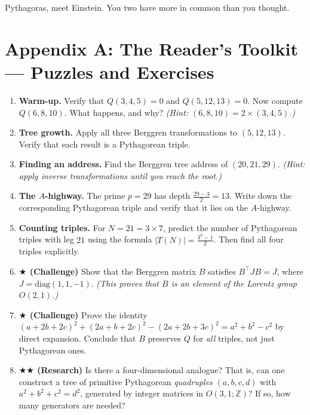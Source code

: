 \documentclass[11pt,twoside,openright]{book}
\theoremstyle{definition}
\theoremstyle{remark}
\begin{document}
Pythagoras, meet Einstein. You two have more in common than you thought.


\section{Appendix A: The Reader's Toolkit --- Puzzles and Exercises}

\begin{enumerate}
  \item \textbf{Warm-up.} Verify that $Q(3, 4, 5) = 0$ and $Q(5, 12, 13) = 0$. Now compute $Q(6, 8, 10)$. What happens, and why? \textit{(Hint: $(6, 8, 10) = 2 \times (3, 4, 5)$.)}

  \item \textbf{Tree growth.} Apply all three Berggren transformations to $(5, 12, 13)$. Verify that each result is a Pythagorean triple.

  \item \textbf{Finding an address.} Find the Berggren tree address of $(20, 21, 29)$. \textit{(Hint: apply inverse transformations until you reach the root.)}

  \item \textbf{The $A$-highway.} The prime $p = 29$ has depth $\frac{29 - 3}{2} = 13$. Write down the corresponding Pythagorean triple and verify that it lies on the $A$-highway.

  \item \textbf{Counting triples.} For $N = 21 = 3 \times 7$, predict the number of Pythagorean triples with leg $21$ using the formula $|T(N)| = \frac{3^k - 1}{2}$. Then find all four triples explicitly.

  \item \textbf{$\bigstar$ (Challenge)} Show that the Berggren matrix $B$ satisfies $B^\top J B = J$, where $J = \text{diag}(1, 1, -1)$. \textit{(This proves that $B$ is an element of the Lorentz group $O(2,1)$.)}

  \item \textbf{$\bigstar$ (Challenge)} Prove the identity $(a + 2b + 2c)^2 + (2a + b + 2c)^2 - (2a + 2b + 3c)^2 = a^2 + b^2 - c^2$ by direct expansion. Conclude that $B$ preserves $Q$ for \textit{all} triples, not just Pythagorean ones.

  \item \textbf{$\bigstar$$\bigstar$ (Research)} Is there a four-dimensional analogue? That is, can one construct a tree of primitive Pythagorean \textit{quadruples} $(a, b, c, d)$ with $a^2 + b^2 + c^2 = d^2$, generated by integer matrices in $O(3,1; \mathbb{Z})$? If so, how many generators are needed?


\end{enumerate}
\end{document}
